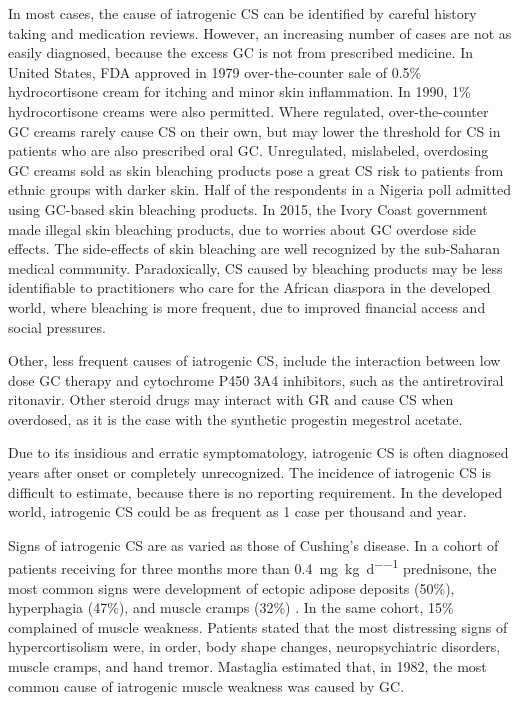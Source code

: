 \documentclass[12pt,english]{report}\usepackage[]{graphicx}\usepackage[]{color}
\begin{document}
In most cases, the cause of iatrogenic CS can be identified by careful
history taking and medication reviews. However, an increasing number
of cases are not as easily diagnosed, because the excess GC is not
from prescribed medicine. In United States, FDA approved in 1979 over-the-counter
sale of 0.5\% hydrocortisone cream for itching and minor skin inflammation.
In 1990, 1\% hydrocortisone creams were also permitted\citep{ravis2007topical}.
Where regulated, over-the-counter GC creams rarely cause CS on their
own, but may lower the threshold for CS in patients who are also prescribed
oral GC. Unregulated, mislabeled, overdosing GC creams sold as skin
bleaching products pose a great CS risk to patients from ethnic groups
with darker skin. Half of the respondents in a Nigeria poll admitted
using GC-based skin bleaching products\citep{adebajo2002epidemiological}.
In 2015, the Ivory Coast government made illegal skin bleaching products,
due to worries about GC overdose side effects\citep{france-presse2015ivory}.
The side-effects of skin bleaching are well recognized by the sub-Saharan
medical community. Paradoxically, CS caused by bleaching products
may be less identifiable to practitioners who care for the African
diaspora in the developed world, where bleaching is more frequent,
due to improved financial access and social pressures\citep{olumide2008complications,rozen2012cosmetic}. 

Other, less frequent causes of iatrogenic CS, include the interaction
between low dose GC therapy and cytochrome P450 3A4 inhibitors, such
as the antiretroviral ritonavir\citep{foisy2008adrenal}. Other steroid
drugs may interact with GR and cause CS when overdosed, as it is the
case with the synthetic progestin megestrol acetate\citep{mann1997glucocorticoidlike}.

Due to its insidious and erratic symptomatology, iatrogenic CS is
often diagnosed years after onset or completely unrecognized\citep{psaras2011demographic}.
The incidence of iatrogenic CS is difficult to estimate, because there
is no reporting requirement. In the developed world, iatrogenic CS
could be as frequent as 1 case per thousand and year\citep{prague2013cushings}.

Signs of iatrogenic CS are as varied as those of Cushing's disease.
In a cohort of patients receiving for three months more than \SI{0.4}{\milli\gram\per\kilo\gram\per\day}
prednisone, the most common signs were development of ectopic adipose
deposits (50\%), hyperphagia (47\%), and muscle cramps (32\%) \citep{fardet2007corticosteroid-induced}.
In the same cohort, 15\% complained of muscle weakness. Patients stated
that the most distressing signs of hypercortisolism were, in order,
body shape changes, neuropsychiatric disorders, muscle cramps, and
hand tremor. Mastaglia estimated that, in 1982, the most common cause
of iatrogenic muscle weakness was caused by GC\citep{mastaglia1982adverse}.
\end{document}
